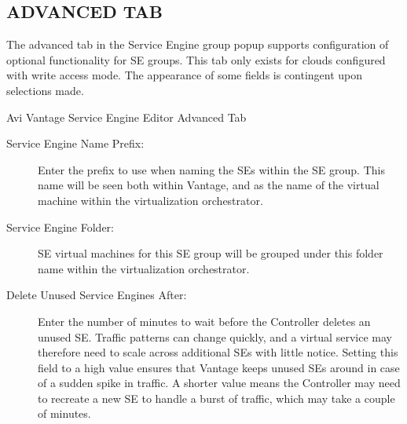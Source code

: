 \documentclass[letterpaper,10pt,english]{sphinxmanual}
\begin{document}
\subsection{ADVANCED TAB}
\label{\detokenize{getting_started/service_engine_group:advanced-tab}}
The advanced tab in the Service Engine group popup supports configuration of optional functionality for SE groups. This tab only exists for clouds configured with write access mode. The appearance of some fields is contingent upon selections made.

Avi Vantage Service Engine Editor Advanced Tab
\begin{description}
\item[{Service Engine Name Prefix:}] \leavevmode
Enter the prefix to use when naming the SEs within the SE group. This name will be seen both within Vantage, and as the name of the virtual machine within the virtualization orchestrator.

\item[{Service Engine Folder:}] \leavevmode
SE virtual machines for this SE group will be grouped under this folder name within the virtualization orchestrator.

\item[{Delete Unused Service Engines After:}] \leavevmode
Enter the number of minutes to wait before the Controller deletes an unused SE. Traffic patterns can change quickly, and a virtual service may therefore need to scale across additional SEs with little notice. Setting this field to a high value ensures that Vantage keeps unused SEs around in case of a sudden spike in traffic. A shorter value means the Controller may need to recreate a new SE to handle a burst of traffic, which may take a couple of minutes.

\end{description}
\end{document}
